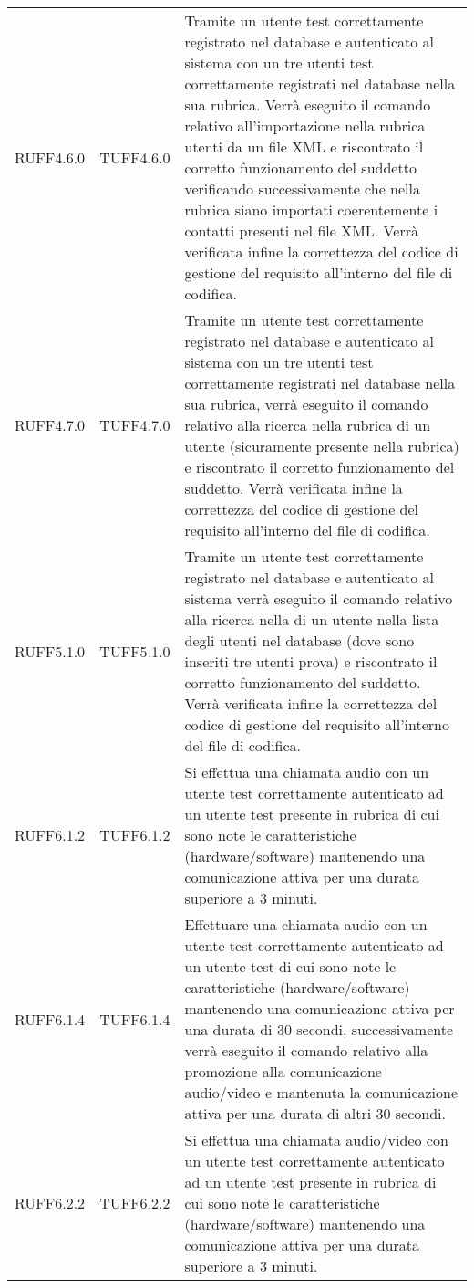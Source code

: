 \begin{center}
\begin{longtable}{llp{}}
RUFF4.6.0 & TUFF4.6.0& Tramite un utente test correttamente registrato nel database e autenticato al sistema con un tre utenti test correttamente registrati nel database nella sua rubrica. Verrà eseguito il comando relativo all'importazione nella rubrica utenti da un file XML e riscontrato il corretto funzionamento del suddetto verificando successivamente che nella rubrica siano importati coerentemente i contatti presenti nel file XML. Verrà verificata infine la correttezza del codice di gestione del requisito all'interno del file di codifica.\\
RUFF4.7.0 & TUFF4.7.0& Tramite un utente test correttamente registrato nel database e autenticato al sistema con un tre utenti test correttamente registrati nel database nella sua rubrica, verrà eseguito il comando relativo alla ricerca nella rubrica di un utente (sicuramente presente nella rubrica) e riscontrato il corretto funzionamento del suddetto. Verrà verificata infine la correttezza del codice di gestione del requisito all'interno del file di codifica.\\
RUFF5.1.0 & TUFF5.1.0& Tramite un utente test correttamente registrato nel database e autenticato al sistema verrà eseguito il comando relativo alla ricerca nella di un utente nella lista degli utenti nel database (dove sono inseriti tre utenti prova) e riscontrato il corretto funzionamento del suddetto. Verrà verificata infine la correttezza del codice di gestione del requisito all'interno del file di codifica.\\
RUFF6.1.2 & TUFF6.1.2& Si effettua una chiamata audio con un utente test correttamente autenticato ad un utente test presente in rubrica di cui sono note le caratteristiche (hardware/software) mantenendo una comunicazione attiva per una durata superiore a 3 minuti.\\
RUFF6.1.4 & TUFF6.1.4& Effettuare una chiamata audio con un utente test correttamente autenticato ad un utente test di cui sono note le caratteristiche (hardware/software) mantenendo una comunicazione attiva per una durata di 30 secondi, successivamente verrà eseguito il comando relativo alla promozione alla comunicazione audio/video e mantenuta la comunicazione attiva per una durata di altri 30 secondi.\\
RUFF6.2.2 & TUFF6.2.2& Si effettua una chiamata audio/video con un utente test correttamente autenticato ad un utente test presente in rubrica di cui sono note le caratteristiche (hardware/software) mantenendo una comunicazione attiva per una durata superiore a 3 minuti.\\

\end{longtable}
\end{center}
